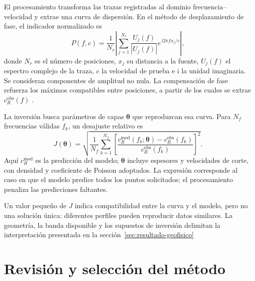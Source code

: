El procesamiento transforma las trazas registradas al dominio frecuencia--velocidad y extrae una curva de dispersión. En el método de desplazamiento de fase, el indicador normalizado es
\begin{equation}
P(f,c)=\frac{1}{N_r}\left|
\sum_{j=1}^{N_r}\frac{U_j(f)}{|U_j(f)|}
e^{\,\mathrm{i}2\pi f x_j/c}\right|,
\label{eq:imagen-dispersion}
\end{equation}
donde $N_r$ es el número de posiciones, $x_j$ su distancia a la fuente, $U_j(f)$ el espectro complejo de la traza, $c$ la velocidad de prueba e $\mathrm{i}$ la unidad imaginaria. Se consideran componentes de amplitud no nula. La compensación de fase refuerza los máximos compatibles entre posiciones, a partir de los cuales se extrae $c_R^{\mathrm{obs}}(f)$ \citep{Park1998,Park1999}.

La inversión busca parámetros de capas $\boldsymbol{\theta}$ que reproduzcan esa curva. Para $N_f$ frecuencias válidas $f_k$, un desajuste relativo es
\begin{equation}
J(\boldsymbol{\theta})=
\sqrt{\frac{1}{N_f}\sum_{k=1}^{N_f}
\left[\frac{c_R^{\mathrm{mod}}(f_k;\boldsymbol{\theta})
-c_R^{\mathrm{obs}}(f_k)}
{c_R^{\mathrm{obs}}(f_k)}\right]^2}.
\label{eq:desajuste}
\end{equation}
Aquí $c_R^{\mathrm{mod}}$ es la predicción del modelo; $\boldsymbol{\theta}$ incluye espesores y velocidades de corte, con densidad y coeficiente de Poisson adoptados. La expresión corresponde al caso en que el modelo predice todos los puntos solicitados; el procesamiento penaliza las predicciones faltantes.

Un valor pequeño de $J$ indica compatibilidad entre la curva y el modelo, pero no una solución única: diferentes perfiles pueden reproducir datos similares. La geometría, la banda disponible y los supuestos de inversión delimitan la interpretación presentada en la sección~\ref{sec:resultado-geofisico} 

\section{Revisión y selección del método}
\label{sec:seleccion}


